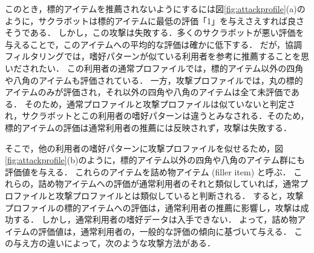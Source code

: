 このとき，標的アイテムを推薦されないようにするには図\ref{fig:attackprofile}(a)のように，サクラボットは標的アイテムに最低の評価「1」を与えさえすれば良さそうである．
しかし，この攻撃は失敗する．多くのサクラボットが悪い評価を与えることで，このアイテムへの平均的な評価は確かに低下する．
だが，協調フィルタリングでは，嗜好パターンが似ている利用者を参考に推薦することを思いだされたい．
この利用者の通常プロファイルでは，標的アイテム以外の四角や八角のアイテムも評価されている．
一方，攻撃プロファイルでは，丸の標的アイテムのみが評価され，それ以外の四角や八角のアイテムは全て未評価である．
そのため，通常プロファイルと攻撃プロファイルは似ていないと判定され，サクラボットとこの利用者の嗜好パターンは違うとみなされる．そのため，標的アイテムの評価は通常利用者の推薦には反映されず，攻撃は失敗する．

そこで，他の利用者の嗜好パターンに攻撃プロファイルを似せるため，図\ref{fig:attackprofile}(b)のように，標的アイテム以外の四角や八角のアイテム群にも評価値を与える．
これらのアイテムを詰め物アイテム (filler item) と呼ぶ．
これらの，詰め物アイテムへの評価が通常利用者のそれと類似していれば，通常プロファイルと攻撃プロファイルとは類似していると判断される．
すると，攻撃プロファイルの標的アイテムへの評価は，通常利用者の推薦に影響し，攻撃は成功する．
しかし，通常利用者の嗜好データは入手できない．
よって，詰め物アイテムの評価値は，通常利用者の，一般的な評価の傾向に基づいて与える．
この与え方の違いによって，次のような攻撃方法がある．
